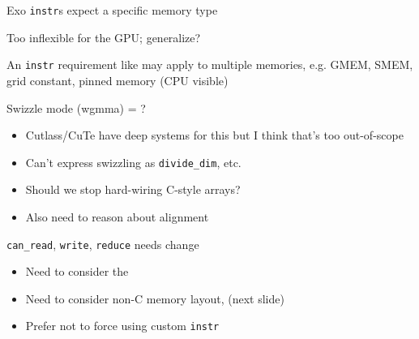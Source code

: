 \begin{minipage}[t]{0.48\textwidth}\fixminipage
Exo \texttt{instr}s expect a specific memory type

Too inflexible for the GPU; generalize?


An \texttt{instr} requirement like  may apply to multiple memories, e.g. GMEM, SMEM, grid constant, pinned memory (CPU visible)


Swizzle mode (wgmma) = ?

\begin{itemize}
  \item Cutlass/CuTe have deep systems for this but I think that's too out-of-scope
  \item Can't express swizzling as \texttt{divide\_dim}, etc.
  \item Should we stop hard-wiring C-style arrays?
  \item Also need to reason about alignment
\end{itemize}


\texttt{can\_read}, \texttt{write}, \texttt{reduce} needs change
\begin{itemize}
  \item Need to consider the 
  \item Need to consider non-C memory layout,  (next slide)
  \item Prefer not to force using custom \texttt{instr}
\end{itemize}


\end{minipage}
\hfill
